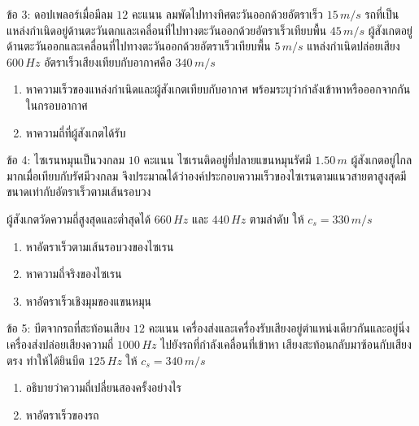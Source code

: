 \begin{exercisebox}{ข้อ 3: ดอปเพลอร์เมื่อมีลม $12$ คะแนน}
ลมพัดไปทางทิศตะวันออกด้วยอัตราเร็ว $15\,\si{m/s}$ รถที่เป็นแหล่งกำเนิดอยู่ด้านตะวันตกและเคลื่อนที่ไปทางตะวันออกด้วยอัตราเร็วเทียบพื้น $45\,\si{m/s}$ ผู้สังเกตอยู่ด้านตะวันออกและเคลื่อนที่ไปทางตะวันออกด้วยอัตราเร็วเทียบพื้น $5\,\si{m/s}$ แหล่งกำเนิดปล่อยเสียง $600\,\si{Hz}$ อัตราเร็วเสียงเทียบกับอากาศคือ $340\,\si{m/s}$

\begin{enumerate}[label=(\alph*)]
    \item หาความเร็วของแหล่งกำเนิดและผู้สังเกตเทียบกับอากาศ พร้อมระบุว่ากำลังเข้าหาหรือออกจากกันในกรอบอากาศ
    \item หาความถี่ที่ผู้สังเกตได้รับ
\end{enumerate}
\end{exercisebox}

\begin{exercisebox}{ข้อ 4: ไซเรนหมุนเป็นวงกลม $10$ คะแนน}
ไซเรนติดอยู่ที่ปลายแขนหมุนรัศมี $1.50\,\si{m}$ ผู้สังเกตอยู่ไกลมากเมื่อเทียบกับรัศมีวงกลม จึงประมาณได้ว่าองค์ประกอบความเร็วของไซเรนตามแนวสายตาสูงสุดมีขนาดเท่ากับอัตราเร็วตามเส้นรอบวง

ผู้สังเกตวัดความถี่สูงสุดและต่ำสุดได้ $660\,\si{Hz}$ และ $440\,\si{Hz}$ ตามลำดับ ให้ $c_s=330\,\si{m/s}$

\begin{enumerate}[label=(\alph*)]
    \item หาอัตราเร็วตามเส้นรอบวงของไซเรน
    \item หาความถี่จริงของไซเรน
    \item หาอัตราเร็วเชิงมุมของแขนหมุน
\end{enumerate}
\end{exercisebox}

\begin{exercisebox}{ข้อ 5: บีตจากรถที่สะท้อนเสียง $12$ คะแนน}
เครื่องส่งและเครื่องรับเสียงอยู่ตำแหน่งเดียวกันและอยู่นิ่ง เครื่องส่งปล่อยเสียงความถี่ $1000\,\si{Hz}$ ไปยังรถที่กำลังเคลื่อนที่เข้าหา เสียงสะท้อนกลับมาซ้อนกับเสียงตรง ทำให้ได้ยินบีต $125\,\si{Hz}$ ให้ $c_s=340\,\si{m/s}$

\begin{enumerate}[label=(\alph*)]
    \item อธิบายว่าความถี่เปลี่ยนสองครั้งอย่างไร
    \item หาอัตราเร็วของรถ
\end{enumerate}
\end{exercisebox}

